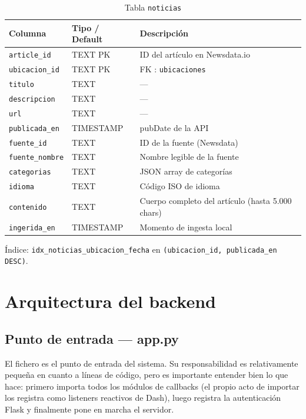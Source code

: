 \documentclass[12pt, a4paper]{article}
\begin{document}
\begin{table}[H]
\centering
\renewcommand{\arraystretch}{1.2}
\begin{tabular}{llp{5.5cm}}
\toprule
\textbf{Columna} & \textbf{Tipo / Default} & \textbf{Descripción} \\
\midrule
\texttt{article\_id}    & TEXT PK       & ID del artículo en Newsdata.io \\
\texttt{ubicacion\_id}  & TEXT PK       & FK : \texttt{ubicaciones} \\
\texttt{titulo}         & TEXT          & — \\
\texttt{descripcion}    & TEXT          & — \\
\texttt{url}            & TEXT          & — \\
\texttt{publicada\_en}  & TIMESTAMP     & pubDate de la API \\
\texttt{fuente\_id}     & TEXT          & ID de la fuente (Newsdata) \\
\texttt{fuente\_nombre} & TEXT          & Nombre legible de la fuente \\
\texttt{categorias}     & TEXT          & JSON array de categorías \\
\texttt{idioma}         & TEXT          & Código ISO de idioma \\
\texttt{contenido}      & TEXT          & Cuerpo completo del artículo (hasta 5.000 chars) \\
\texttt{ingerida\_en}   & TIMESTAMP     & Momento de ingesta local \\
\bottomrule
\end{tabular}
\caption{Tabla \texttt{noticias}}
\end{table}

Índice: \texttt{idx\_noticias\_ubicacion\_fecha} en \texttt{(ubicacion\_id, publicada\_en DESC)}.

\section{Arquitectura del backend}

\subsection{Punto de entrada — app.py}

El fichero  es el punto de entrada del sistema. Su responsabilidad es relativamente pequeña en cuanto a líneas de código, pero es importante entender bien lo que hace: primero importa todos los módulos de callbacks (el propio acto de importar los registra como listeners reactivos de Dash), luego registra la autenticación Flask y finalmente pone en marcha el servidor.
\end{document}
